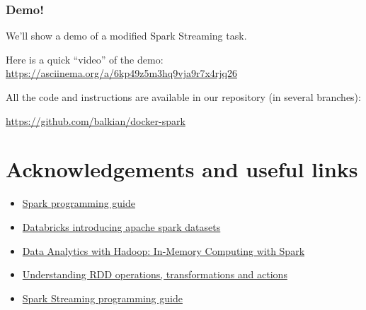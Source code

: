\documentclass{beamer}
\begin{document}
\begin{frame}[fragile]
  \frametitle{Demo!}
  
We'll show a demo of a modified Spark Streaming task.

Here is a quick ``video'' of the demo: 
  {\Large \href{https://asciinema.org/a/6kp49z5m3hq9vja9r7x4rjq26}{https://asciinema.org/a/6kp49z5m3hq9vja9r7x4rjq26} }
  
All the code and instructions are available in our repository (in several branches):

{\Large \href{https://github.com/balkian/docker-spark}{https://github.com/balkian/docker-spark}}

\end{frame}

\section{Acknowledgements and useful links}

\begin{frame}
  \begin{itemize}
\item \href{http://spark.apache.org/docs/latest/programming-guide.html}{Spark programming guide}
\item \href{https://databricks.com/blog/2016/01/04/introducing-apache-spark-datasets.html}{Databricks introducing apache spark datasets}
\item \href{https://www.safaribooksonline.com/library/view/data-analytics-with/9781491913734/ch04.html}{Data Analytics with Hadoop: In-Memory Computing with Spark}
\item \href{https://trongkhoanguyenblog.wordpress.com/2014/11/27/understand-rdd-operations-transformations-and-actions/}{Understanding RDD operations, transformations and actions}
\item \href{http://spark.apache.org/docs/latest/streaming-programming-guide.html}{Spark Streaming programming guide}
  \end{itemize}
\end{frame}
\end{document}
